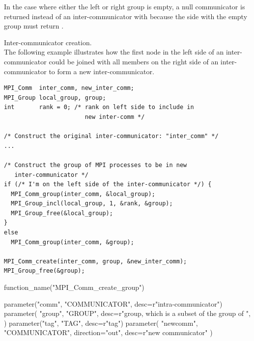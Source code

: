 \begin{rationale}
In the case where either the left or right group is empty, a null communicator
is returned instead of an inter-communicator with 
because the side with the empty group must return .
\end{rationale}

\begin{example}
\label{ex:intercomm creation}
%
%
Inter-communicator creation.\\
The following example illustrates how the first node in the left
side of an inter-communicator could be joined with all members on the
right side of an inter-communicator to form a new
inter-communicator.
\begin{lstlisting}[language={[MPI]C}]
MPI_Comm  inter_comm, new_inter_comm;
MPI_Group local_group, group;
int       rank = 0; /* rank on left side to include in
                       new inter-comm */

/* Construct the original inter-communicator: "inter_comm" */
...

/* Construct the group of MPI processes to be in new
   inter-communicator */
if (/* I'm on the left side of the inter-communicator */) {
  MPI_Comm_group(inter_comm, &local_group);
  MPI_Group_incl(local_group, 1, &rank, &group);
  MPI_Group_free(&local_group);
}
else
  MPI_Comm_group(inter_comm, &group);

MPI_Comm_create(inter_comm, group, &new_inter_comm);
MPI_Group_free(&group);
\end{lstlisting}
\end{example}

\begin{mpi-binding}
    function_name("MPI_Comm_create_group")
    
    parameter("comm", "COMMUNICATOR", desc=r"intra-communicator")
    parameter(
        "group",
        "GROUP",
        desc=r"group, which is a subset of the group of ",
    )
    parameter("tag", "TAG", desc=r"tag")
    parameter(
        "newcomm", "COMMUNICATOR", direction="out", desc=r"new communicator"
    )
\end{mpi-binding}

